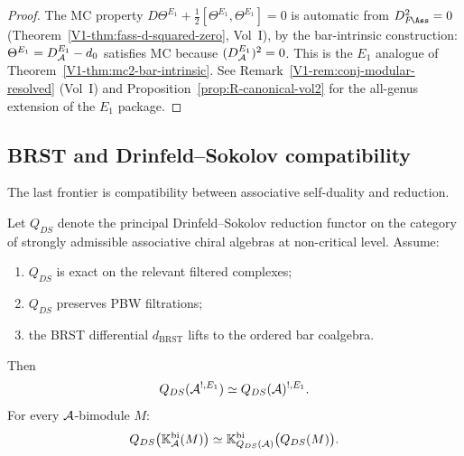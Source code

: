 \begin{proof}
The MC property $D\Theta^{E_1} + \tfrac12[\Theta^{E_1},\Theta^{E_1}]
= 0$ is automatic from $D_{F\!\Ass}^2 = 0$
(Theorem~\ref*{V1-thm:fass-d-squared-zero}, Vol~I), by the bar-intrinsic
construction: $\Theta^{E_1} = D^{E_1}_{\mathcal{A}} - d_0$ satisfies MC
because $(D^{E_1}_{\mathcal{A}})^2 = 0$. This is the $E_1$ analogue of
Theorem~\ref*{V1-thm:mc2-bar-intrinsic}.
See Remark~\ref*{V1-rem:conj-modular-resolved} (Vol~I) and
Proposition~\ref{prop:R-canonical-vol2} for the all-genus extension
of the $E_1$ package.
\end{proof}

\subsection{BRST and Drinfeld--Sokolov compatibility}

The last frontier is compatibility between associative self-duality and reduction.

\begin{theorem}
\label{thm:DS}
Let $Q_{DS}$ denote the principal Drinfeld--Sokolov reduction functor
on the category of strongly admissible associative chiral algebras
at non-critical level. Assume:
\begin{enumerate}[label=(\alph*)]
\item $Q_{DS}$ is exact on the relevant filtered complexes;
\item $Q_{DS}$ preserves PBW filtrations;
\item the BRST differential $d_{\mathrm{BRST}}$ lifts to the ordered
 bar coalgebra.
\end{enumerate}
Then
\[
Q_{DS}(\mathcal{A}^{!,E_1})\simeq Q_{DS}(\mathcal{A})^{!,E_1}.
\]
For every $\mathcal{A}$-bimodule $M$\textup{:}
\[
Q_{DS}\bigl(\mathbb{K}_{\mathcal{A}}^{\mathrm{bi}}(M)\bigr)\simeq
\mathbb{K}_{Q_{DS}(\mathcal{A})}^{\mathrm{bi}}\bigl(Q_{DS}(M)\bigr).
\]
\end{theorem}

